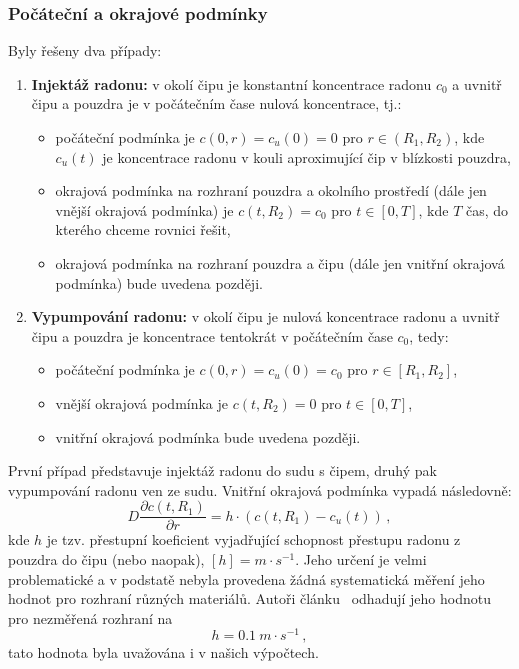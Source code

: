 \documentclass[11pt,a4paper]{article}
\begin{document}
\subsubsection{Počáteční a okrajové podmínky}
Byly řešeny dva případy:
\begin{enumerate}
	\item \textbf{Injektáž radonu:} v okolí čipu je konstantní koncentrace radonu $c_0$ a uvnitř čipu a pouzdra je v počátečním čase nulová koncentrace, tj.:
	\begin{itemize}
		\item počáteční podmínka je $c(0,r)=c_u(0)=0$ pro $r\in(R_1, R_2)$, kde $c_u(t)$ je koncentrace radonu v kouli aproximující čip v blízkosti pouzdra,
		\item okrajová podmínka na rozhraní pouzdra a okolního prostředí (dále jen vnější okrajová podmínka) je $c(t,R_2)=c_0$ pro $t\in[0,T]$, kde $T$ čas, do kterého chceme rovnici řešit,
		\item okrajová podmínka na rozhraní pouzdra a čipu (dále jen vnitřní okrajová podmínka) bude uvedena později.
	\end{itemize}
	 
	\item \textbf{Vypumpování radonu:} v okolí čipu je nulová koncentrace radonu a uvnitř čipu a pouzdra je koncentrace tentokrát v počátečním čase $c_0$, tedy:
	\begin{itemize}
		\item počáteční podmínka je $c(0,r)=c_u(0)=c_0$ pro $r\in[R_1, R_2]$,
		\item vnější okrajová podmínka je $c(t,R_2)=0$ pro $t\in[0,T]$,
		\item vnitřní okrajová podmínka bude uvedena později.
	\end{itemize} 
\end{enumerate}
První případ představuje injektáž radonu do sudu s čipem, druhý pak vypumpování radonu ven ze sudu. Vnitřní okrajová podmínka vypadá následovně:
\begin{equation}
	D\frac{\partial c(t,R_1)}{\partial r}=h\cdot(c(t,R_1)-c_u(t))\,,\label{eq:vnitrniOkrPodm}
\end{equation}
kde $h$ je tzv. přestupní koeficient vyjadřující schopnost přestupu radonu z pouzdra do čipu (nebo naopak), $[h]=\si{m\cdot s^{-1}}$. Jeho určení je velmi problematické a v podstatě nebyla provedena žádná systematická měření jeho hodnot pro rozhraní různých materiálů. Autoři článku~\cite{jiranek1} odhadují jeho hodnotu pro nezměřená rozhraní na
\begin{equation}
	h=\SI{0,1}{m\cdot s^{-1}}\,,
\end{equation}
tato hodnota byla uvažována i v našich výpočtech.
\end{document}
